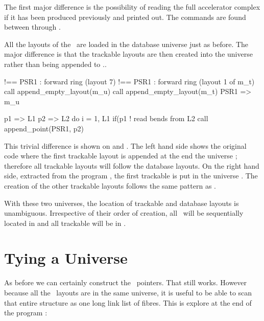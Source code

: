 The first major difference is the possibility of reading the full accelerator complex if it has been produced previously and printed out. 
The commands are found between  through . 

All the layouts of the \DNA\ are loaded in the database universe  just as before. The major difference is that the trackable layouts are then created into the universe  rather than being appended to ..

 
{\scriptsize
{}
\begin{ptccode}
!== PSR1 : forward ring  (layout 7)                       !== PSR1 : forward ring  (layout 1 of m_t)   \label{lin:dif:1}
call append_empty_layout(m_u)                             call append_empty_layout(m_t) \label{lin:dif:2}
PSR1 => m_u%

p1 => L1%
p2 => L2%
do i = 1, L1%
  if(p1%
    ! read bends from L2                                            
    call append_point(PSR1, p2)                                     
\end{ptccode}
}

This trivial difference is shown on  and . The left hand side shows the original code where the first trackable layout   is appended at the end the universe ; therefore all trackable layouts will follow the database layouts.  On the right hand side, extracted from the program , the first  trackable  is put in the universe . The creation of the other trackable layouts follows the same pattern as .

With these two universes, the location of trackable and database layouts is unambiguous. Irrespective of their order of creation, all \DNA\ will be sequentially located in  and all trackable will be in .

 
\section{Tying a Universe}
\label{sec:model.tie}

As before we can certainly construct the \DNA\ pointers. That still works. However because all the \DNA\ layouts  are in the same universe, it is useful to be able to scan that entire structure as one long link list of fibres. This is explore at the end of the program :

